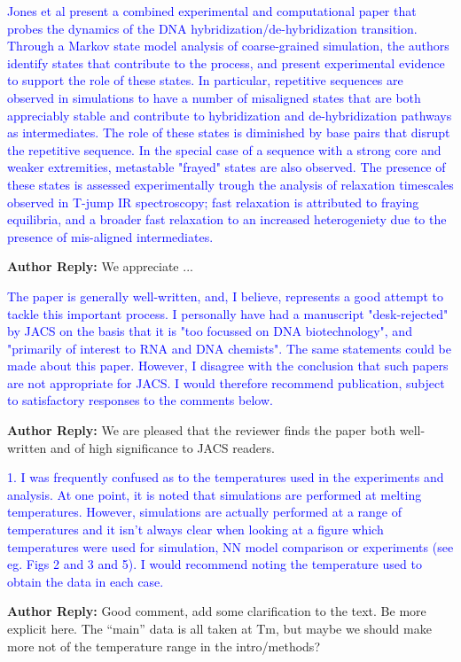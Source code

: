 \documentclass[11pt,a4paper]{letter} %
\begin{document}
\textcolor{blue}{Jones et al present a combined experimental and computational paper that probes the dynamics of the DNA hybridization/de-hybridization transition. Through a Markov state model analysis of coarse-grained simulation, the authors identify states that contribute to the process, and present experimental evidence to support the role of these states. In particular, repetitive sequences are observed in simulations to have a number of misaligned states that are both appreciably stable and contribute to hybridization and de-hybridization pathways as intermediates. The role of these states is diminished by base pairs that disrupt the repetitive sequence. In the special case of a sequence with a strong core and weaker extremities, metastable "frayed" states are also observed. The presence of these states is assessed experimentally trough the analysis of relaxation timescales observed in T-jump IR spectroscopy; fast relaxation is attributed to fraying equilibria, and a broader fast relaxation to an increased heterogeniety due to the presence of mis-aligned intermediates.}

\textbf{Author Reply:}   We appreciate ...

\textcolor{blue}{The paper is generally well-written, and, I believe, represents a good attempt to tackle this important process. I personally have had a manuscript "desk-rejected" by JACS on the basis that it is "too focussed on DNA biotechnology", and "primarily of interest to RNA and DNA chemists". The same statements could be made about this paper. However, I disagree with the conclusion that such papers are not appropriate for JACS. I would therefore recommend publication, subject to satisfactory responses to the comments below.  }

\textbf{Author Reply:}   We are pleased that the reviewer finds the paper both well-written and of high significance to JACS readers.

\textcolor{blue}{1.   I was frequently confused as to the temperatures used in the experiments and analysis. At one point, it is noted that simulations are performed at melting temperatures. However, simulations are actually performed at a range of temperatures and it isn't always clear when looking at a figure which temperatures were used for simulation, NN model comparison or experiments (see eg. Figs 2 and 3 and 5). I would recommend noting the temperature used to obtain the data in each case.}

\textbf{Author Reply:}   Good comment, add some clarification to the text. Be more explicit here. The “main” data is all taken at Tm, but maybe we should make more not of the temperature range in the intro/methods? 
\end{document}
